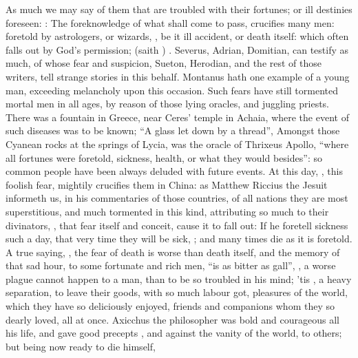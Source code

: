 As much we may say of them that are troubled with their fortunes; or ill
destinies foreseen: : The foreknowledge of
what shall come to pass, crucifies many men: foretold by astrologers, or
wizards, , be it ill accident, or death itself: which
often falls out by God's permission;  (saith
\Chrysostom{}) . Severus, Adrian, Domitian, can
testify as much, of whose fear and suspicion, Sueton, Herodian, and the rest of
those writers, tell strange stories in this behalf.
Montanus  hath one
example of a young man, exceeding melancholy upon this occasion. Such fears
have still tormented mortal men in all ages, by reason of those lying oracles,
and juggling priests. There was a fountain in Greece, near
Ceres' temple in Achaia, where the event of such diseases was to be known; \enquote{A
glass let down by a thread}, \etc{} Amongst those Cyanean rocks at the springs
of Lycia, was the oracle of Thrixeus Apollo, \enquote{where all fortunes were foretold,
sickness, health, or what they would besides}: so common people have been
always deluded with future events. At this day, , this foolish fear, mightily crucifies them in China: as
Matthew Riccius the Jesuit informeth us, in his
commentaries of those countries, of all nations they are most superstitious,
and much tormented in this kind, attributing so much to their divinators,
, that fear itself and conceit, cause it to
fall out: If he foretell sickness such a day, that very
time they will be sick, ; and many
times die as it is foretold. A true saying, , the
fear of death is worse than death itself, and the memory of that sad hour, to
some fortunate and rich men, \enquote{is as bitter as gall},  , a worse plague cannot happen
to a man, than to be so troubled in his mind; 'tis , a
heavy separation, to leave their goods, with so much labour got, pleasures of
the world, which they have so deliciously enjoyed, friends and companions whom
they so dearly loved, all at once. Axicchus the philosopher was bold and
courageous all his life, and gave good precepts , and
against the vanity of the world, to others; but being now ready to die himself,
